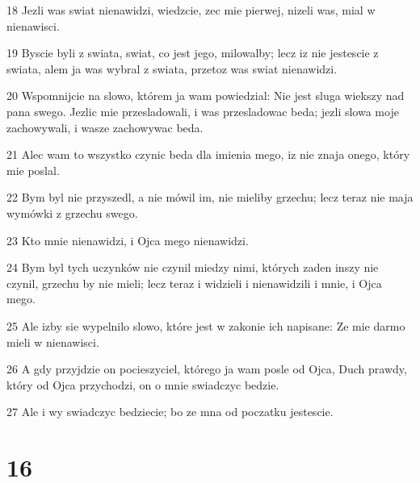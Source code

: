 \par 18 Jezli was swiat nienawidzi, wiedzcie, zec mie pierwej, nizeli was, mial w nienawisci.
\par 19 Byscie byli z swiata, swiat, co jest jego, milowalby; lecz iz nie jestescie z swiata, alem ja was wybral z swiata, przetoz was swiat nienawidzi.
\par 20 Wspomnijcie na slowo, którem ja wam powiedzial: Nie jest sluga wiekszy nad pana swego. Jezlic mie przesladowali, i was przesladowac beda; jezli slowa moje zachowywali, i wasze zachowywac beda.
\par 21 Alec wam to wszystko czynic beda dla imienia mego, iz nie znaja onego, który mie poslal.
\par 22 Bym byl nie przyszedl, a nie mówil im, nie mieliby grzechu; lecz teraz nie maja wymówki z grzechu swego.
\par 23 Kto mnie nienawidzi, i Ojca mego nienawidzi.
\par 24 Bym byl tych uczynków nie czynil miedzy nimi, których zaden inszy nie czynil, grzechu by nie mieli; lecz teraz i widzieli i nienawidzili i mnie, i Ojca mego.
\par 25 Ale izby sie wypelnilo slowo, które jest w zakonie ich napisane: Ze mie darmo mieli w nienawisci.
\par 26 A gdy przyjdzie on pocieszyciel, którego ja wam posle od Ojca, Duch prawdy, który od Ojca przychodzi, on o mnie swiadczyc bedzie.
\par 27 Ale i wy swiadczyc bedziecie; bo ze mna od poczatku jestescie.

\chapter{16}

